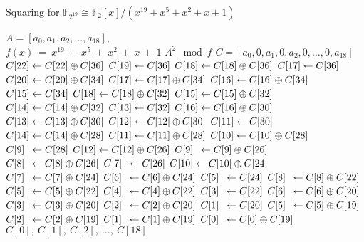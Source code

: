 \documentclass{ufscThesis}
\newcommand{\F}{\mathbb{F}}
\newcommand{\mathbox}[3][l]{\makebox[\widthof{$#2$}][#1]{$#3$}}
\begin{document}
\begin{algorithm}
\caption{Squaring for $\F_{2^{19}} \cong \F_2[x]/(x^{19} + x^5 + x^2 + x + 1)$}
\label{alg:square:example}
\begin{multicols}{2}
\begin{algorithmic}[1]
\REQUIRE $A = [a_0, a_1, a_2, ..., a_{18}]$, \\$f(x)~=~x^{19}~+~x^5~+~x^2~+~x~+~1$
\ENSURE $A^2 \mod f$
\STATE $C = [a_0, 0, a_1, 0, a_2, 0, \ldots, 0, a_{18}]$
\STATE $\mathbox{C[22]}{C[22]} \leftarrow C[22]  \oplus  C[36]$
\STATE $\mathbox{C[22]}{C[19]} \leftarrow C[36]$
\STATE $\mathbox{C[22]}{C[18]} \leftarrow C[18]  \oplus  C[36]$
\STATE $\mathbox{C[22]}{C[17]} \leftarrow C[36]$
\STATE $\mathbox{C[22]}{C[20]} \leftarrow C[20]  \oplus  C[34]$
\STATE $\mathbox{C[22]}{C[17]} \leftarrow C[17]  \oplus  C[34]$
\STATE $\mathbox{C[22]}{C[16]} \leftarrow C[16]  \oplus  C[34]$
\STATE $\mathbox{C[22]}{C[15]} \leftarrow C[34]$
\STATE $\mathbox{C[22]}{C[18]} \leftarrow C[18]  \oplus  C[32]$
\STATE $\mathbox{C[22]}{C[15]} \leftarrow C[15]  \oplus  C[32]$
\STATE $\mathbox{C[22]}{C[14]} \leftarrow C[14]  \oplus  C[32]$
\STATE $\mathbox{C[22]}{C[13]} \leftarrow C[32]$
\STATE $\mathbox{C[22]}{C[16]} \leftarrow C[16]  \oplus  C[30]$
\STATE $\mathbox{C[22]}{C[13]} \leftarrow C[13]  \oplus  C[30]$
\STATE $\mathbox{C[22]}{C[12]} \leftarrow C[12]  \oplus  C[30]$
\STATE $\mathbox{C[22]}{C[11]} \leftarrow C[30]$
\STATE $\mathbox{C[22]}{C[14]} \leftarrow C[14]  \oplus  C[28]$
\STATE $\mathbox{C[22]}{C[11]} \leftarrow C[11]  \oplus  C[28]$
\STATE $\mathbox{C[22]}{C[10]} \leftarrow C[10]  \oplus  C[28]$
\STATE $\mathbox{C[22]}{C[9]} \leftarrow C[28]$
\STATE $\mathbox{C[22]}{C[12]} \leftarrow C[12]  \oplus  C[26]$
\STATE $\mathbox{C[22]}{C[9]} \leftarrow C[9]  \oplus  C[26]$
\STATE $\mathbox{C[22]}{C[8]} \leftarrow C[8]  \oplus  C[26]$
\STATE $\mathbox{C[22]}{C[7]} \leftarrow C[26]$
\STATE $\mathbox{C[22]}{C[10]} \leftarrow C[10]  \oplus  C[24]$
\STATE $\mathbox{C[22]}{C[7]} \leftarrow C[7]  \oplus  C[24]$
\STATE $\mathbox{C[22]}{C[6]} \leftarrow C[6]  \oplus  C[24]$
\STATE $\mathbox{C[22]}{C[5]} \leftarrow C[24]$
\STATE $\mathbox{C[22]}{C[8]} \leftarrow C[8]  \oplus  C[22]$
\STATE $\mathbox{C[22]}{C[5]} \leftarrow C[5]  \oplus  C[22]$
\STATE $\mathbox{C[22]}{C[4]} \leftarrow C[4]  \oplus  C[22]$
\STATE $\mathbox{C[22]}{C[3]} \leftarrow C[22]$
\STATE $\mathbox{C[22]}{C[6]} \leftarrow C[6]  \oplus  C[20]$
\STATE $\mathbox{C[22]}{C[3]} \leftarrow C[3]  \oplus  C[20]$
\STATE $\mathbox{C[22]}{C[2]} \leftarrow C[2]  \oplus  C[20]$
\STATE $\mathbox{C[22]}{C[1]} \leftarrow C[20]$
\STATE $\mathbox{C[22]}{C[5]} \leftarrow C[5]  \oplus  C[19]$
\STATE $\mathbox{C[22]}{C[2]} \leftarrow C[2]  \oplus  C[19]$
\STATE $\mathbox{C[22]}{C[1]} \leftarrow C[1]  \oplus  C[19]$
\STATE $\mathbox{C[22]}{C[0]} \leftarrow C[0]  \oplus  C[19]$
\RETURN $C[0],~C[1],~C[2],~\ldots,~C[18]$
\end{algorithmic}
\end{multicols}
\end{algorithm}
\end{document}
